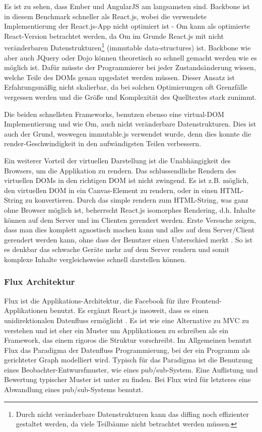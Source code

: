 \documentclass[12pt,twoside]{book}
\begin{document}
Es ist zu sehen, dass Ember und AngularJS am langsamsten sind. Backbone ist in diesem Benchmark schneller als React.js, wobei die verwendete Implementierung der React.js-App nicht optimiert ist - Om\cite{om} kann als optimierte React-Version betrachtet werden, da Om im Grunde React.js mit nicht veränderbaren Datenstrukturen\footnote{Durch nicht veränderbare Datenstrukturen kann das diffing noch effizienter gestaltet werden, da viele Teilbäume nicht betrachtet werden müssen.} (immutable data-structures) ist. Backbone wie aber auch JQuery oder Dojo können theoretisch so schnell gemacht werden wie es möglich ist. Dafür müsste der Programmierer bei jeder Zustandsänderung wissen, welche Teile des DOMs genau upgedatet werden müssen. Dieser Ansatz ist Erfahrungsmäßig nicht skalierbar, da bei solchen Optimierungen oft Grenzfälle vergessen werden und die Größe und Komplexität des Quelltextes stark zunimmt.

Die beiden schnellsten Frameworks, benutzen ebenso eine virtual-DOM Implementierung und wie Om, auch nicht veränderbare Datenstrukturen.
Dies ist auch der Grund, weswegen immutable.js\cite{Immutable} verwendet wurde, denn dies konnte die render-Geschwindigkeit in den aufwändigsten Teilen verbessern.

Ein weiterer Vorteil der virtuellen Darstellung ist die Unabhängigkeit des Browsers, um die Applikation zu rendern. Das schlussendliche Rendern des virtuellen DOMs in den richtigen DOM ist nicht zwingend. Es ist z.B. möglich, den virtuellen DOM in ein Canvas-Element zu rendern, oder in einen HTML-String zu konvertieren.
Durch das simple rendern zum HTML-String, was ganz ohne Browser möglich ist, beherrscht React.js isomorphes Rendering, d.h. Inhalte können auf dem Server und im Clienten gerendert werden. Erste Versuche zeigen, dass man dies komplett agnostisch machen kann und alles auf dem Server/Client gerendert werden kann, ohne dass der Benutzer einen Unterschied merkt \cite{overblog}. So ist es denkbar das schwache Geräte mehr auf dem Server rendern und somit komplexe Inhalte vergleichsweise schnell darstellen können.

\subsubsection*{Flux Architektur}

Flux ist die Applikations-Architektur, die Facebook für ihre Frontend-Applikationen benutzt. Es ergänzt React.js insoweit, dass es einen unidirektionalen Datenfluss ermöglicht \cite{flux}. Es ist wie eine Alternative zu MVC zu verstehen und ist eher ein Muster um Applikationen zu schreiben als ein Framework, das einem rigoros die Struktur vorschreibt. Im Allgemeinen benutzt Flux das Paradigma der Datenfluss Programmierung\cite{johnston2004advances}, bei der ein Programm als gerichteter Graph modelliert wird. Typisch für das Paradigma ist die Benutzung eines Beobachter-Entwursfmuster, wie eines pub/sub-System. Eine Auflistung und Bewertung typischer Muster ist unter \citep{signals} zu finden. Bei Flux wird für letzteres eine Abwandlung eines pub/sub-Systems benutzt.
\end{document}

